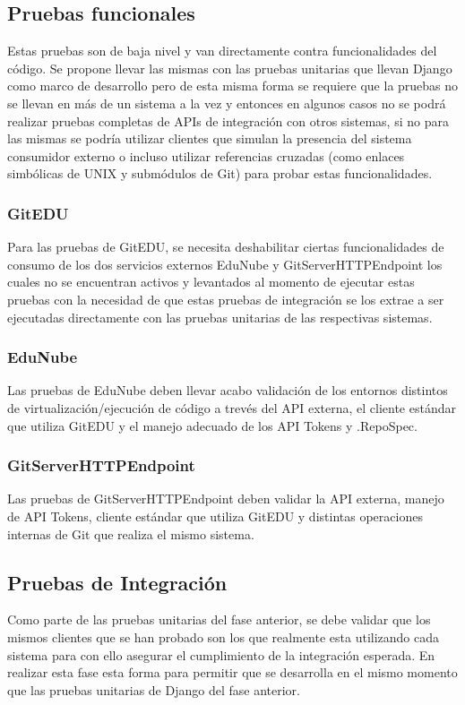 \subsection{Pruebas funcionales}
Estas pruebas son de baja nivel y van directamente contra funcionalidades del código. Se propone llevar las mismas con las pruebas unitarias que llevan Django como marco de desarrollo pero de esta misma forma se requiere que la pruebas no se llevan en más de un sistema a la vez y entonces en algunos casos no se podrá realizar pruebas completas de APIs de integración con otros sistemas, si no para las mismas se podría utilizar clientes que simulan la presencia del sistema consumidor externo o incluso utilizar referencias cruzadas (como enlaces simbólicas de UNIX y submódulos de Git) para probar estas funcionalidades.

\subsubsection{GitEDU}
Para las pruebas de GitEDU, se necesita deshabilitar ciertas funcionalidades de consumo de los dos servicios externos EduNube y GitServerHTTPEndpoint los cuales no se encuentran activos y levantados al momento de ejecutar estas pruebas con la necesidad de que estas pruebas de integración se los extrae a ser ejecutadas directamente con las pruebas unitarias de las respectivas sistemas.

\subsubsection{EduNube}
Las pruebas de EduNube deben llevar acabo validación de los entornos distintos de virtualización/ejecución de código a trevés del API externa, el cliente estándar que utiliza GitEDU y el manejo adecuado de los API Tokens y .RepoSpec.

\subsubsection{GitServerHTTPEndpoint}
Las pruebas de GitServerHTTPEndpoint deben validar la API externa, manejo de API Tokens, cliente estándar que utiliza GitEDU y distintas operaciones internas de Git que realiza el mismo sistema.

\subsection{Pruebas de Integración}
Como parte de las pruebas unitarias del fase anterior, se debe validar que los mismos clientes que se han probado son los que realmente esta utilizando cada sistema para con ello asegurar el cumplimiento de la integración esperada. En realizar esta fase  esta forma para permitir que se desarrolla en el mismo momento que las pruebas unitarias de Django del fase anterior.

